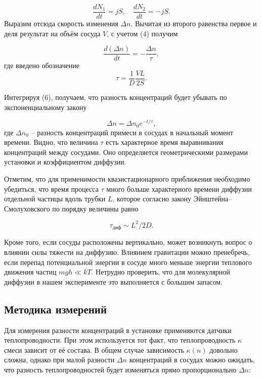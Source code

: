 \documentclass[12pt,a4paper]{article}
\begin{document}
\begin{equation}
\frac{dN_1}{dt}=jS, \quad \frac{dN_2}{dt}=-jS.
\end{equation}
Выразим отсюда скорость изменения $ \Delta n $. Вычитая из второго равенства первое и деля результат на объём сосуда $ V $, с учетом (4) получим

\begin{equation}
\frac{d(\Delta n)}{dt}=-\frac{\Delta n}{\tau},
\end{equation}
где введено обозначение
\begin{equation}
\tau=\frac{1}{D}\frac{VL}{2S}.
\end{equation}

Интегрируя (6), получаем, что разность концентраций будет убывать по экспоненциальному закону

\begin{equation}
\Delta n = \Delta n_0 e^{-t/\tau},
\end{equation}
где $ \Delta n_0 $ -- разность концентраций примеси в сосудах в начальный момент времени. Видно, что величина $ \tau $ есть характерное время выравнивания концентраций между сосудами. Оно определяется геометрическими размерами установки и коэффициентом диффузии.

Отметим, что для применимости квазистационарного приближения необходимо убедиться, что время процесса $ \tau $ много больше характерного времени диффузии отдельной частицы вдоль трубки $ L $, которое согласно закону Эйнштейна–Смолуховского по порядку величины равно

\begin{equation}
\tau_\text{диф} \sim L^2/2D.
\end{equation}

Кроме того, если сосуды расположены вертикально, может возникнуть вопрос о влиянии силы тяжести на диффузию. Влиянием гравитации можно пренебречь, если перепад потенциальной энергии в сосуде много меньше энергии теплового движения частиц $ mgh \ll kT $. Нетрудно проверить, что для молекулярной диффузии в нашем эксперименте это выполняется с большим запасом.

\subsection{Методика измерений}

Для измерения разности концентраций в установке применяются датчики теплопроводности. При этом используется тот факт, что теплопроводность $ \kappa $ смеси зависит от её состава. В общем случае зависимость $ \kappa(n) $ довольно сложна, однако при малой разности $ \Delta n $ концентраций в сосудах можно ожидать, что разность теплопроводностей будет изменяться прямо пропорционально $ \Delta n $:
\end{document}
